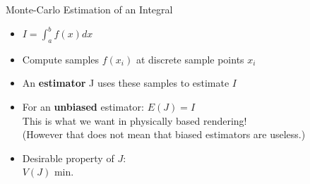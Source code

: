 \documentclass[utf8,stillsansserifmath,fleqn,t]{beamer}
\newcommand{\ds}{\displaystyle}
\begin{document}
\begin{frame}[label=unbiased]
\frametitle{\insertsection}
Monte-Carlo Estimation of an Integral
\begin{itemize}
\item $\displaystyle I = \int_a^b f(x)dx$
\item Compute samples $f(x_i)$ at discrete sample points $x_i$
\item An \textbf{estimator} J uses these samples to estimate $I$
\item For an \textbf{unbiased} estimator: $\ds E(J) = I$\\
    This is what we want in physically based rendering!\\
    (However that does not mean that biased estimators are useless.)
\item Desirable property of $J$:\\
    $V(J)$ min.
\end{itemize}
\end{frame}
\end{document}
